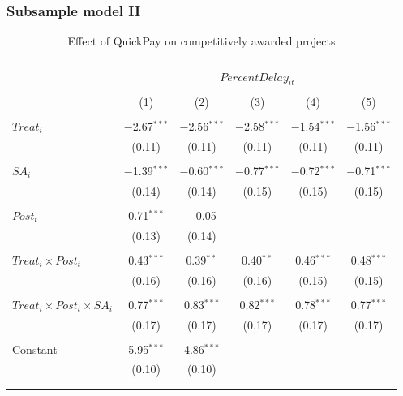 \documentclass[
]{article}
\begin{document}
\hypertarget{subsample-model-ii}{%
\subsubsection{Subsample model II}\label{subsample-model-ii}}

\begin{table}[H] \centering 
  \caption{Effect of QuickPay on competitively awarded projects} 
  \label{} 
\small 
\begin{tabular}{@{\extracolsep{-2pt}}lccccc} 
\\[-1.8ex]\hline 
\hline \\[-1.8ex] 
\\[-1.8ex] & \multicolumn{5}{c}{$PercentDelay_{it}$  } \\ 
\\[-1.8ex] & (1) & (2) & (3) & (4) & (5)\\ 
\hline \\[-1.8ex] 
 $Treat_i$ & $-$2.67$^{***}$ & $-$2.56$^{***}$ & $-$2.58$^{***}$ & $-$1.54$^{***}$ & $-$1.56$^{***}$ \\ 
  & (0.11) & (0.11) & (0.11) & (0.11) & (0.11) \\ 
  & & & & & \\ 
 $SA_i$ & $-$1.39$^{***}$ & $-$0.60$^{***}$ & $-$0.77$^{***}$ & $-$0.72$^{***}$ & $-$0.71$^{***}$ \\ 
  & (0.14) & (0.14) & (0.15) & (0.15) & (0.15) \\ 
  & & & & & \\ 
 $Post_t$ & 0.71$^{***}$ & $-$0.05 &  &  &  \\ 
  & (0.13) & (0.14) &  &  &  \\ 
  & & & & & \\ 
 $Treat_i \times Post_t$ & 0.43$^{***}$ & 0.39$^{**}$ & 0.40$^{**}$ & 0.46$^{***}$ & 0.48$^{***}$ \\ 
  & (0.16) & (0.16) & (0.16) & (0.15) & (0.15) \\ 
  & & & & & \\ 
 $Treat_i \times Post_t \times SA_i $ & 0.77$^{***}$ & 0.83$^{***}$ & 0.82$^{***}$ & 0.78$^{***}$ & 0.77$^{***}$ \\ 
  & (0.17) & (0.17) & (0.17) & (0.17) & (0.17) \\ 
  & & & & & \\ 
 Constant & 5.95$^{***}$ & 4.86$^{***}$ &  &  &  \\ 
  & (0.10) & (0.10) &  &  &  \\ 
  & & & & & \\ 
\hline \\[-1.8ex] 

\end{tabular}
\end{table}
\end{document}
